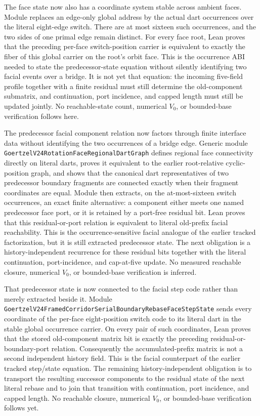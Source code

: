 \documentclass[11pt]{article}
\theoremstyle{definition}
\begin{document}
The face state now also has a coordinate system stable across ambient faces.
Module
replaces an edge-only global address by the actual dart occurrences over the
literal eight-edge switch.  There are at most sixteen such occurrences, and
the two sides of one primal edge remain distinct.  For every face root, Lean
proves that the preceding per-face switch-position carrier is equivalent to
exactly the fiber of this global carrier on the root's orbit face.  This is the
occurrence ABI needed to state the predecessor-state equation without silently
identifying two facial events over a bridge.  It is not yet that equation: the
incoming five-field profile together with a finite residual must still
determine the old-component submatrix, and continuation, port incidence, and
capped length must still be updated jointly.  No reachable-state count,
numerical $V_0$, or bounded-base verification follows here.

The predecessor facial component relation now factors through finite interface
data without identifying the two occurrences of a bridge edge.  Generic module
\texttt{GoertzelV24RotationFaceRegionalDartGraph} defines regional face
connectivity directly on literal darts, proves it equivalent to the earlier
root-relative cyclic-position graph, and shows that the canonical dart
representatives of two predecessor boundary fragments are connected exactly
when their fragment coordinates are equal.  Module
then extracts, on the at-most-sixteen switch occurrences, an exact finite
alternative: a component either meets one named predecessor face port, or it
is retained by a port-free residual bit.  Lean proves that this residual-or-port
relation is equivalent to literal old-prefix facial reachability.  This is the
occurrence-sensitive facial analogue of the earlier tracked factorization, but
it is still extracted predecessor state.  The next obligation is a
history-independent recurrence for these residual bits together with the
literal continuation, port-incidence, and cap-at-five update.  No measured
reachable closure, numerical $V_0$, or bounded-base verification is inferred.

That predecessor state is now connected to the facial step code rather than
merely extracted beside it.  Module
\texttt{GoertzelV24FramedCorridorSerialBoundaryRebaseFaceStepState} sends every
coordinate of the per-face eight-position switch code to its literal dart in
the stable global occurrence carrier.  On every pair of such coordinates,
Lean proves that the stored old-component matrix bit is exactly the preceding
residual-or-boundary-port relation.  Consequently the accumulated-prefix
matrix is not a second independent history field.  This is the facial
counterpart of the earlier tracked step/state equation.  The remaining
history-independent obligation is to transport the resulting successor
components to the residual state of the next literal rebase and to join that
transition with continuation, port incidence, and capped length.  No reachable
closure, numerical $V_0$, or bounded-base verification follows yet.
\end{document}
